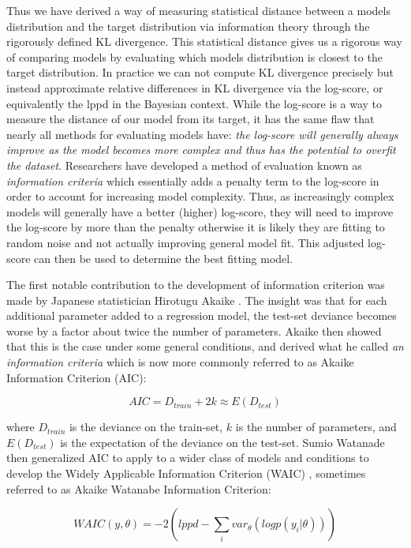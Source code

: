 Thus we have derived a way of measuring statistical distance between a models distribution and the target distribution via information theory through the rigorously defined KL divergence. This statistical distance gives us a rigorous way of comparing models by evaluating which models distribution is closest to the target distribution. In practice we can not compute KL divergence precisely but instead approximate relative differences in KL divergence via the log-score, or equivalently the lppd in the Bayesian context. While the log-score is a way to measure the distance of our model from its target, it has the same flaw that nearly all methods for evaluating models have: \textit{the log-score will generally always improve as the model becomes more complex and thus has the potential to overfit the dataset}. Researchers have developed a method of evaluation known as \textit{information criteria} which essentially adds a penalty term to the log-score in order to account for increasing model complexity. Thus, as increasingly complex models will generally have a better (higher) log-score, they will need to improve the log-score by more than the penalty otherwise it is likely they are fitting to random noise and not actually improving general model fit. This adjusted log-score can then be used to determine the best fitting model.

The first notable contribution to the development of information criterion was made by Japanese statistician Hirotugu Akaike \cite{Akaike1974}. The insight was that for each additional parameter added to a regression model, the test-set deviance becomes worse by a factor about twice the number of parameters. Akaike then showed that this is the case under some general conditions, and derived what he called \textit{an information criteria} which is now more commonly referred to as Akaike Information Criterion (AIC):

\begin{equation}
AIC = D_{train} + 2k \approx E(D_{test})
\end{equation}

where $D_{train}$ is the deviance on the train-set, $k$ is the number of parameters, and $E(D_{test})$ is the expectation of the deviance on the test-set. Sumio Watanade then generalized AIC to apply to a wider class of models and conditions to develop the Widely Applicable Information Criterion (WAIC) \cite{Watanabe2010}, sometimes referred to as Akaike Watanabe Information Criterion:

\begin{equation} \label{eq:waic}
WAIC(y, \theta) = -2 \left( lppd - \sum_i var_{\theta}(logp(y_i|\theta)) \right)
\end{equation}

